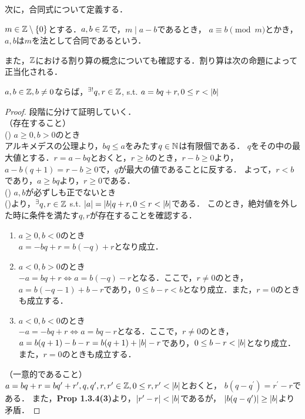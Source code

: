     次に，合同式について定義する．

    \begin{dfn}
      $m \in \mathbb{Z} \setminus \lbrace0\rbrace$とする．$a, b \in \mathbb{Z}$で，$m \mid a-b$であるとき，
      $a \equiv b \pmod m$とかき，$a,b$は$m$を法として合同であるという．
    \end{dfn}

    また，$\mathbb{Z}$における割り算の概念についても確認する．割り算は次の命題によって正当化される．

    \begin{prop}
      $a, b \in \mathbb{Z}, b \neq 0$ならば，$^{\exists !}q,r \in \mathbb{Z}$, s.t. $a=bq+r, 0 \leq r < \lvert b\rvert$
    \end{prop}

    \begin{proof}
      段階に分けて証明していく． \\
      （存在すること） \\
      () $a \geq 0, b > 0$のとき \\
      アルキメデスの公理より，$bq \leq a$をみたす$q \in \mathbb{N}$は有限個である．
      $q$をその中の最大値とする．$r = a-bq$とおくと，$r \geq b$のとき，$r-b \geq 0$より，
      $a-b(q+1) = r - b \geq 0$で，$q$が最大の値であることに反する．
      よって，$r < b$であり，$a \geq bq$より，$r \geq 0$である．\\
      () $a,b$が必ずしも正でないとき \\
      ()より，$^{\exists}q,r \in \mathbb{Z}$ s.t. $\lvert a\rvert = \lvert b\rvert q + r, 0 \leq r < \lvert b\rvert$である．
      このとき，絶対値を外した時に条件を満たす$q,r$が存在することを確認する．
      \begin{enumerate}
        \item $a \geq 0, b < 0$のとき\\
        $a = -bq + r = b(-q) + r$となり成立．
        \item $a < 0, b > 0$のとき\\
        $-a = bq + r \iff a = b(-q)-r$となる．ここで，$r \neq 0$のとき，
        $a = b(-q-1) + b-r$であり，$0 \leq b-r < b$となり成立．また，$r = 0$のときも成立する．
        \item $a < 0, b < 0のとき$\\
        $-a = -bq + r \iff a = bq - r$となる．ここで，$r \neq 0$のとき，
        $a = b(q+1)-b-r = b(q+1) + \lvert b\rvert - r$であり，$0 \leq b-r < \lvert b\rvert$となり成立．また，$r = 0$のときも成立する．
      \end{enumerate}
      （一意的であること）\\
      $a = bq + r = bq^{\prime}+r^{\prime}, q, q^{\prime}, r, r^{\prime} \in \mathbb{Z}, 0 \leq r, r^{\prime} < \lvert b\rvert$とおくと，
      $b(q-q^{\prime}) = r^{\prime} - r$である．
      また，\textbf{Prop 1.3.4(3)}より，$\lvert r^{\prime} - r\rvert < \lvert b\rvert$であるが，
      $\lvert b(q-q^{\prime})\rvert \geq \lvert b\rvert$より矛盾．
    \end{proof}

